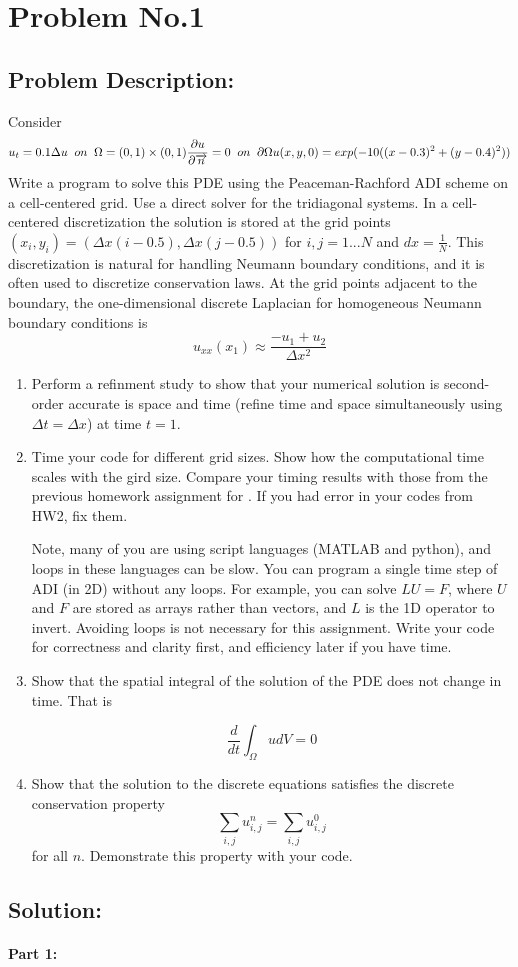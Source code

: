 \section{Problem No.1} \label{sec:prob2}
\subsection{Problem Description:} 

Consider 
$$
u_{t} =0.1 \Delta u \; \; on \; \;  \Omega = (0,1) \times (0,1)\\
\frac{\partial u}{\partial \overrightarrow{n}} = 0 \; \; on  \; \; \partial \Omega \\
u(x,y,0) = exp(-10((x-0.3)^2 +(y-0.4)^2))
$$
Write a program to solve this PDE using the Peaceman-Rachford ADI scheme on a cell-centered grid. Use a direct solver for the tridiagonal systems. In a cell-centered discretization the solution is stored at the grid points $(x_{i},y_{i}) = (\Delta x(i-0.5), \Delta x(j-0.5))$ for $i,j=1...N$ and $dx=\frac{1}{N}$. This discretization is natural for handling Neumann boundary conditions, and it is often used to discretize conservation laws. At the grid points adjacent to the boundary, the one-dimensional discrete Laplacian for homogeneous Neumann boundary conditions is 
$$
u_{xx}(x_{1}) \approx \frac{-u_{1}+u_{2}}{\Delta x^{2}}
$$
\begin{enumerate}
\item Perform a refinment study to show that your numerical solution is second-order accurate is space and time (refine time and space simultaneously using $\Delta t = \Delta x$) at time $t=1$.
\item Time your code for different grid sizes. Show how the computational time scales with the gird size. Compare your timing results with those from the previous homework assignment for \cn. If you had error in your codes from HW2, fix them.

Note, many of you are using script languages (MATLAB and python), and loops in these languages can be slow. You can program a single time step of ADI (in 2D) without any loops. For example, you can solve $LU=F$, where $U$ and $F$ are stored as arrays rather than vectors, and $L$ is the 1D operator to invert. Avoiding loops is not necessary for this assignment. Write your code for correctness and clarity first, and efficiency later if you have time.
\item Show that the spatial integral of the solution of the PDE does not change in time. That is 

$$
\frac{d}{dt} \int_{\Omega} u dV=0
$$
\item Show that the solution to the discrete equations satisfies the discrete conservation property 
$$
\sum_{i,j} u_{i,j}^{n} = \sum_{i,j}u_{i,j}^{0}
$$
for all $n$. Demonstrate this property with your code. 


\end{enumerate}

\subsection{Solution:} 
\paragraph{Part 1:}